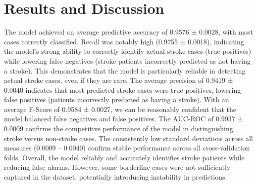 \section{Results and Discussion}
The model achieved an average predictive accuracy of 0.9576 ± 0.0028, with most cases correctly classified. Recall was notably high (0.9755 ± 0.0018), indicating the model's strong ability to correctly identify actual stroke cases (true positives) while lowering false negatives (stroke patients incorrectly predicted as not having a stroke). This demonstrates that the model is particularly reliable in detecting actual stroke cases, even if they are rare. The average precision of 0.9419 ± 0.0040 indicates that most predicted stroke cases were true positives, lowering false positives (patients incorrectly predicted as having a stroke). With an average F-Score of 0.9584 ± 0.0027, we can be reasonably confident that the model balanced false negatives and false positives. The AUC-ROC of 0.9937 ± 0.0009 confirms the competitive performance of the model in distinguishing stroke versus non-stroke cases. The consistently low standard deviations across all measures (0.0009 – 0.0040) confirm stable performance across all cross-validation folds. Overall, the model reliably and accurately identifies stroke patients while reducing false alarms. However, some borderline cases were not sufficiently captured in the dataset, potentially introducing instability in predictions.
